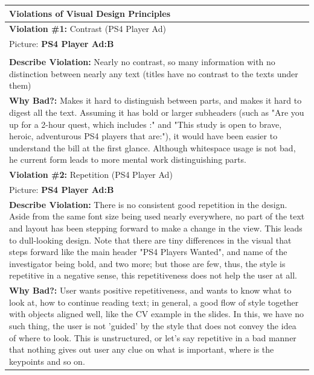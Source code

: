 \documentclass[a4paper,11pt,oneside]{scrreprt}
\begin{document}
\begin{tabularx}{\textwidth}{|X|}
	\hline
		\textbf{Violations of Visual Design Principles}
		\\
	\hline
		\textbf{Violation \#1:} Contrast (PS4 Player Ad)\\
		Picture: \textbf{PS4 Player Ad:B}\\
		
		\\
		\textbf{Describe Violation:} Nearly no contrast, so many information with no distinction between nearly any text (titles have no contrast to the texts under them)
		
		
		\\
		\textbf{Why Bad?:} Makes it hard to distinguish between parts, and makes it hard to digest all the text. Assuming it has bold or larger subheaders (such as "Are you up for a 2-hour quest, which includes :" and "This study is open to brave, heroic, adventurous PS4 players that are:"), it would have been easier to understand the bill at the first glance. Although whitespace usage is not bad, he current form leads to more mental work distinguishing parts.
		
	\\
	\hline
	
		\textbf{Violation \#2:} Repetition (PS4 Player Ad)\\
		Picture: \textbf{PS4 Player Ad:B}
		
		\\
		\textbf{Describe Violation:} There is no consistent good repetition in the design. Aside from the same font size being used nearly everywhere, no part of the text and layout has been stepping forward to make a change in the view. This leads to dull-looking design. Note that there are tiny differences in the visual that steps forward like the main header "PS4 Players Wanted", and name of the investigator being bold, and two more; but those are few, thus, the style is repetitive in a negative sense, this repetitiveness does not help the user at all. 
		
		\\
		\textbf{Why Bad?:} User wants positive repetitiveness, and wants to know what to look at, how to continue reading text; in general, a good flow of style together with objects aligned well, like the CV example in the slides. In this, we have no such thing, the user is not 'guided' by the style that does not convey the idea of where to look. This is unstructured, or let's say repetitive in a bad manner that nothing gives out user any clue on what is important, where is the keypoints and so on.
		

\end{tabularx}
\end{document}
